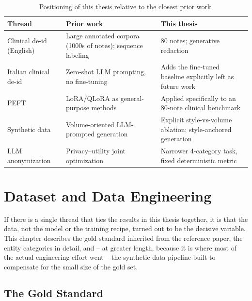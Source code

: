 \documentclass[12pt,a4paper]{report}
\begin{document}
\begin{table}[htbp]
\centering
\caption{Positioning of this thesis relative to the closest prior work.}
\label{tab:related-positioning}
\begin{tabular}{p{3.6cm}p{5.6cm}p{5.6cm}}
\toprule
Thread & Prior work & This thesis \\
\midrule
Clinical de-id (English) & Large annotated corpora (1000s of notes); sequence labeling \citep{stubbs2015automated,dernoncourt2017deidentification} & 80 notes; generative redaction \\
Italian clinical de-id & Zero-shot LLM prompting, no fine-tuning \citep{miranda2025mamma} & Adds the fine-tuned baseline explicitly left as future work \\
PEFT & LoRA/QLoRA as general-purpose methods \citep{hu2021lora,dettmers2023qlora} & Applied specifically to an 80-note clinical benchmark \\
Synthetic data & Volume-oriented LLM-prompted generation \citep{woo2024syntheticdistillation} & Explicit style-vs-volume ablation; style-anchored generation \\
LLM anonymization & Privacy--utility joint optimization \citep{yang2025rupta} & Narrower 4-category task, fixed deterministic metric \\
\bottomrule
\end{tabular}
\end{table}

\chapter{Dataset and Data Engineering}
\label{ch:data}

If there is a single thread that ties the results in this thesis together, it is that the data, not the model or the training recipe, turned out to be the decisive variable. This chapter describes the gold standard inherited from the reference paper, the entity categories in detail, and -- at greater length, because it is where most of the actual engineering effort went -- the synthetic data pipeline built to compensate for the small size of the gold set.

\section{The Gold Standard}
\end{document}
